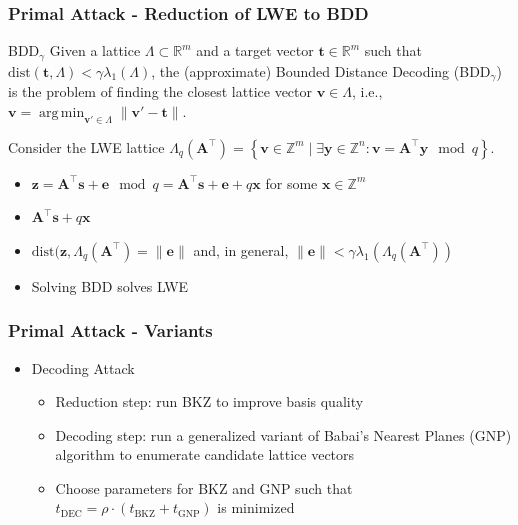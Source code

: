 \documentclass[t, aspectratio=169]{beamer}
\DeclareMathOperator*{\argmin}{arg\,min}
\begin{document}
\begin{frame}
    \frametitle{Primal Attack - Reduction of LWE to BDD}
    \begin{block}{BDD$_\gamma$}
        Given a lattice $\Lambda \subset \mathbb{R}^m$ and a target vector $\mathbf{t}\in\mathbb{R}^m$ such that $\text{dist}(\mathbf{t}, \Lambda) < \gamma \lambda_1(\Lambda)$, the (approximate)  Bounded Distance Decoding (BDD$_\gamma$) is the problem of finding the closest lattice vector $\mathbf{v} \in \Lambda$, i.e., $\mathbf{v} = \argmin_{\mathbf{v}' \in \Lambda} \|\mathbf{v}' - \mathbf{t}\|$.
    \end{block}\pause
    Consider the LWE lattice $\Lambda_q(\mathbf{A}^\intercal) = \left\{ \mathbf{v} \in \mathbb{Z}^m \mid \exists \mathbf{y} \in \mathbb{Z}^n : \mathbf{v} = \mathbf{A}^\intercal \mathbf{y} \mod q \right\}$.\pause
    \begin{itemize}[<+->]
        \item $\mathbf{z} = \mathbf{A}^\intercal \mathbf{s} + \mathbf{e} \mod q = \mathbf{A}^\intercal \mathbf{s} + \mathbf{e} + q \mathbf{x}$ for some $\mathbf{x} \in \mathbb{Z}^m$
        \item $\mathbf{A}^\intercal \mathbf{s} + q \mathbf{x}$
        \item $\text{dist}(\mathbf{z}, \Lambda_q(\mathbf{A}^\intercal) = \|\mathbf{e}\|$ and, in general, $\|\mathbf{e}\| < \gamma \lambda_1(\Lambda_q(\mathbf{A}^\intercal))$ %
        \item Solving BDD solves LWE
    \end{itemize}
\end{frame}
\begin{frame}
    \frametitle{Primal Attack - Variants}
    \begin{itemize}[<+->]
        \item Decoding Attack
              \begin{itemize}[<+->]
                  \item Reduction step: run BKZ to improve basis quality
                  \item Decoding step: run a generalized variant of Babai's Nearest Planes (GNP) algorithm to enumerate candidate lattice vectors%
                  \item Choose parameters for BKZ and GNP such that $t_{\text{DEC}} = \rho\cdot (t_{\text{BKZ}} + t_{\text{GNP}})$ is minimized %
              \end{itemize}
    \end{itemize}
\end{frame}
\end{document}
